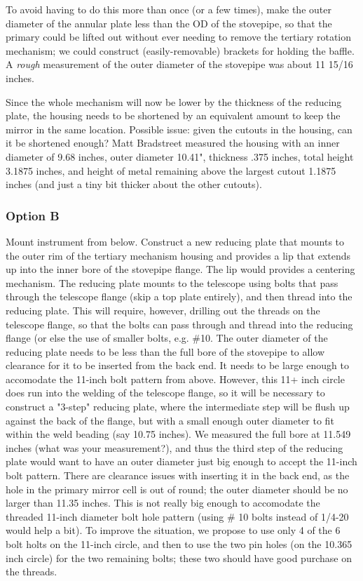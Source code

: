 \documentclass{article}
\begin{document}
To avoid having to do this more than  once (or a few times), make
the outer diameter of the annular plate less than the OD of the
stovepipe, so that the primary could be lifted out without ever
needing to remove the tertiary rotation mechanism; we could construct
(easily-removable) brackets for holding the baffle. A \textit{rough} measurement
of the outer diameter of the stovepipe was about 11 15/16 inches.

Since the whole mechanism will now be lower by the 
thickness of the reducing plate, the
housing needs to be shortened by an equivalent amount to keep the
mirror in the same location. Possible issue: given the cutouts in
the housing, can it be shortened enough?  Matt Bradstreet measured the
housing with an inner diameter of 9.68 inches, outer diameter 10.41", 
thickness .375 inches, total height 3.1875 inches, and height of metal
remaining above the largest cutout 1.1875 inches (and just a tiny bit
thicker about the other cutouts).

\subsubsection{Option B}
 Mount instrument from below. Construct a new reducing
plate that mounts to the outer rim of the tertiary mechanism housing
and provides a lip that extends up into the inner bore
of the stovepipe flange. The lip would provides a centering mechanism.
The reducing plate mounts to the telescope using bolts that pass
through the telescope flange (skip a top plate entirely), and then
thread into the reducing plate. This will require, however, drilling
out the threads on the telescope flange, so that the bolts can pass
through and thread into the reducing flange (or else the use of
smaller bolts, e.g. \#10. The outer diameter of the reducing plate
needs to be less than the full bore of the stovepipe to allow
clearance for it to be inserted from the back end. It needs to be
large enough to accomodate the 11-inch bolt pattern from above.
However, this 11+ inch circle does run into the welding of the
telescope flange, so it will be necessary to construct a "3-step"
reducing plate, where the intermediate step will be flush up against
the back of the flange, but with a small enough outer diameter to
fit within the weld beading (say 10.75 inches).  We measured the
full bore at 11.549 inches (what was your measurement?), and thus
the third step of the reducing plate would want to have an outer
diameter just big enough to accept the 11-inch bolt pattern.  There
are clearance issues with inserting it in the back end, as the hole
in the primary mirror cell is out of round; the outer diameter
should be no larger than 11.35 inches. This is not really big enough
to accomodate the threaded 11-inch diameter bolt hole pattern (using
\# 10 bolts instead of 1/4-20 would help a bit). To improve the
situation, we propose to use only 4 of the 6 bolt holts on the
11-inch circle, and then to use the two pin holes (on the 10.365
inch circle) for the two remaining bolts; these two should have
good purchase on the threads.
\end{document}
